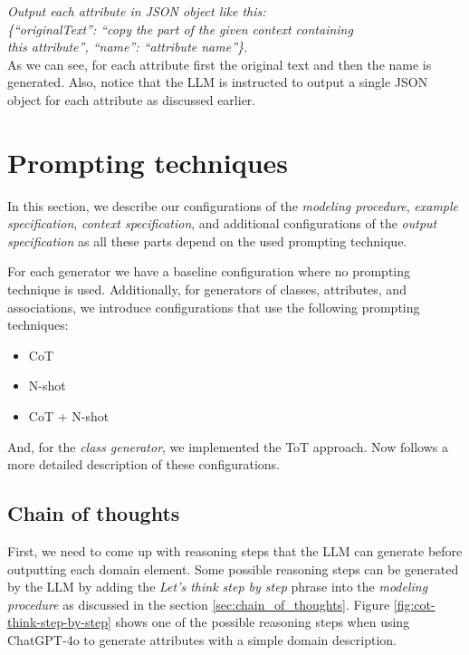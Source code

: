 \noindent{}\textit{Output each attribute in JSON object like this: \\
\{``originalText'': ``copy the part of the given context containing \\ this attribute'', ``name'': ``attribute name''\}.} \\

\noindent{}As we can see, for each attribute first the original text and then the name is generated. Also, notice that the LLM is instructed to output a single JSON object for each attribute as discussed earlier.



\section{Prompting techniques}

In this section, we describe our configurations of the \emph{modeling procedure}, \emph{example specification}, \emph{context specification}, and additional configurations of the \emph{output specification} as all these parts depend on the used prompting technique.

For each generator we have a baseline configuration where no prompting technique is used. Additionally, for generators of classes, attributes, and associations, we introduce configurations that use the following prompting techniques:

\begin{itemize}
\item CoT
\item N-shot
\item CoT + N-shot
\end{itemize}

\noindent{}And, for the \emph{class generator}, we implemented the ToT approach. Now follows a more detailed description of these configurations.


\subsection{Chain of thoughts}

First, we need to come up with reasoning steps that the LLM can generate before outputting each domain element. Some possible reasoning steps can be generated by the LLM by adding the \textit{Let's think step by step} phrase into the \emph{modeling procedure} as discussed in the section \ref{sec:chain_of_thoughts}. Figure \ref{fig:cot-think-step-by-step} shows one of the possible reasoning steps when using ChatGPT-4o to generate attributes with a simple domain description.

